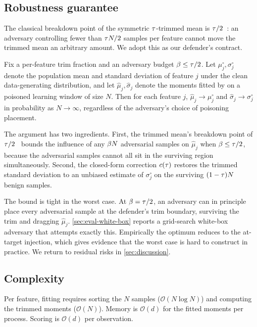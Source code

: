 \subsection{Robustness guarantee}

The classical breakdown point of the symmetric $\tau$-trimmed mean
is $\tau/2$~\cite{huber1964robust}: an adversary controlling fewer
than $\tau N / 2$ samples per feature cannot move the trimmed mean
an arbitrary amount. We adopt this as our defender's contract.

\begin{proposition}\label{prop:robust}
Fix a per-feature trim fraction \trim{} and an adversary budget
$\beta \leq \tau/2$. Let $\mu^{\circ}_j, \sigma^{\circ}_j$ denote
the population mean and standard deviation of feature $j$ under the
clean data-generating distribution, and let
$\hat{\mu}_j, \hat{\sigma}_j$ denote the moments fitted by
\sediment{} on a poisoned learning window of size $N$. Then for each
feature $j$, $\hat{\mu}_j \to \mu^{\circ}_j$ and
$\hat{\sigma}_j \to \sigma^{\circ}_j$ in probability as
$N \to \infty$, regardless of the adversary's choice of poisoning
placement.
\end{proposition}

The argument has two ingredients. First, the trimmed mean's
breakdown point of $\tau/2$~\cite{huber1964robust} bounds the
influence of any $\beta N$ adversarial samples on $\hat{\mu}_j$
when $\beta \leq \tau/2$, because the adversarial samples cannot
all sit in the surviving region simultaneously. Second, the
closed-form correction $c(\tau)$ restores the trimmed standard
deviation to an unbiased estimate of $\sigma^{\circ}_j$ on the
surviving $(1 - \tau) N$ benign samples.

The bound is tight in the worst case. At $\beta = \tau/2$, an
adversary can in principle place every adversarial sample at the
defender's trim boundary, surviving the trim and dragging
$\hat{\mu}_j$. \cref{sec:eval-white-box} reports a grid-search
white-box adversary that attempts exactly this. Empirically the
optimum reduces to the at-target injection, which gives evidence
that the worst case is hard to construct in practice. We return to
residual risks in \cref{sec:discussion}.

\subsection{Complexity}

Per feature, fitting requires sorting the $N$ samples
($\mathcal{O}(N \log N)$) and computing the trimmed moments
($\mathcal{O}(N)$). Memory is $\mathcal{O}(d)$ for the fitted
moments per process. Scoring is $\mathcal{O}(d)$ per observation.
